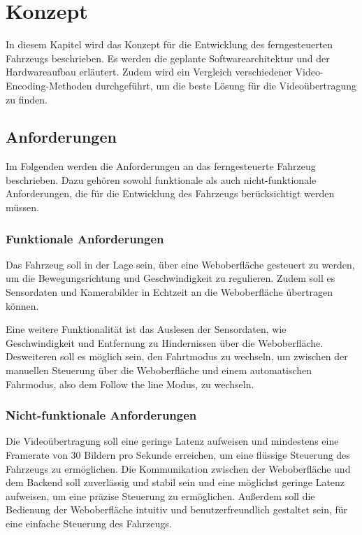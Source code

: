 \chapter{Konzept}
\label{chap:konzept}
In diesem Kapitel wird das Konzept für die Entwicklung des ferngesteuerten Fahrzeugs beschrieben. Es werden die geplante Softwarearchitektur und der Hardwareaufbau erläutert. Zudem wird ein Vergleich verschiedener Video-Encoding-Methoden durchgeführt, um die beste Lösung für die Videoübertragung zu finden.

\section{Anforderungen}
Im Folgenden werden die Anforderungen an das ferngesteuerte Fahrzeug beschrieben. Dazu gehören sowohl funktionale als auch nicht-funktionale Anforderungen, die für die Entwicklung des Fahrzeugs berücksichtigt werden müssen.

    \subsection{Funktionale Anforderungen}
    Das Fahrzeug soll in der Lage sein, über eine Weboberfläche gesteuert zu werden, um die Bewegungsrichtung und Geschwindigkeit zu regulieren. Zudem soll es Sensordaten und Kamerabilder in Echtzeit an die Weboberfläche übertragen können.

    Eine weitere Funktionalität ist das Auslesen der Sensordaten, wie Geschwindigkeit und Entfernung zu Hindernissen über die Weboberfläche. Desweiteren soll es möglich sein, den Fahrtmodus zu wechseln, um zwischen der manuellen Steuerung über die Weboberfläche und einem automatischen Fahrmodus, also dem Follow the line Modus, zu wechseln. 

    \subsection{Nicht-funktionale Anforderungen}
    Die Videoübertragung soll eine geringe Latenz aufweisen und mindestens eine Framerate von 30 Bildern pro Sekunde erreichen, um eine flüssige Steuerung des Fahrzeugs zu ermöglichen. Die Kommunikation zwischen der Weboberfläche und dem Backend soll zuverlässig und stabil sein und eine möglichst geringe Latenz aufweisen, um eine präzise Steuerung zu ermöglichen. Außerdem soll die Bedienung der Weboberfläche intuitiv und benutzerfreundlich gestaltet sein, für eine einfache Steuerung des Fahrzeugs.

